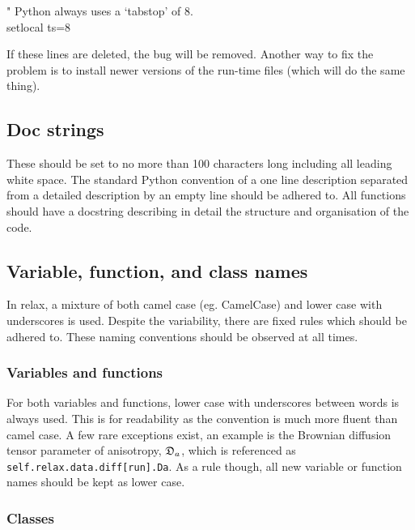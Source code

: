 \begin{exampleenv}
" Python always uses a `tabstop' of 8. \\
setlocal ts=8
\end{exampleenv}

If these lines are deleted, the bug will be removed.  Another way to fix the problem is to install newer versions of the run-time files (which will do the same thing).



\subsection{Doc strings}

These should be set to no more than 100 characters long including all leading white space.  The standard Python convention of a one line description separated from a detailed description by an empty line should be adhered to.  All functions should have a docstring describing in detail the structure and organisation of the code.



\subsection{Variable, function, and class names}

In relax, a mixture of both camel case (eg. CamelCase) and lower case with underscores is used.  Despite the variability, there are fixed rules which should be adhered to.  These naming conventions should be observed at all times.


\subsubsection{Variables and functions}

For both variables and functions, lower case with underscores between words is always used.  This is for readability as the convention is much more fluent than camel case.  A few rare exceptions exist, an example is the Brownian diffusion tensor parameter of anisotropy, $\mathfrak{D}_a$, which is referenced as \texttt{self.relax.data.diff[run].Da}.  As a rule though, all new variable or function names should be kept as lower case.


\subsubsection{Classes}

